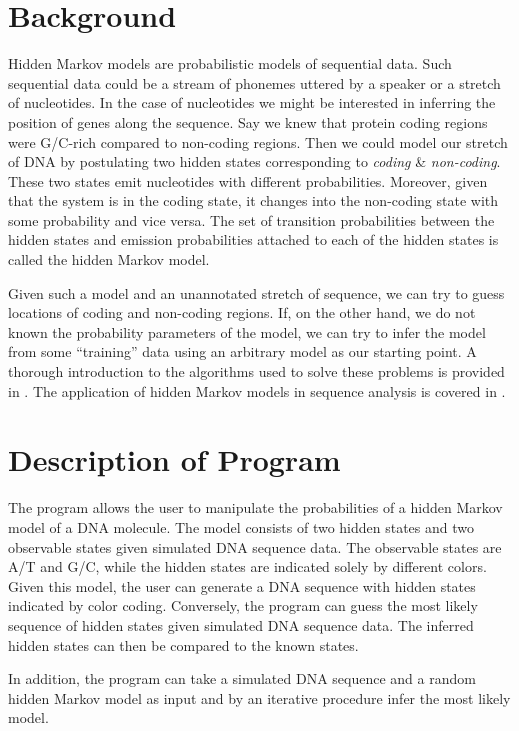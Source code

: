 \section{Background}
Hidden Markov models are probabilistic models of sequential data. Such
sequential data could be a stream of phonemes uttered by a speaker or
a stretch of nucleotides. In the case of nucleotides we might be
interested in inferring the position of genes along the sequence. Say we knew that
protein coding regions
were G/C-rich compared to non-coding regions. Then we could model our
stretch of DNA by postulating two hidden states corresponding to
\textit{coding} \& \textit{non-coding}. These two states emit nucleotides with
different probabilities. Moreover, given that the system is in the
coding state, it changes into the non-coding state with some
probability and vice versa. The set of transition probabilities between the
hidden states and emission probabilities attached to each of the hidden states is
called the hidden Markov model.

Given such a model and an unannotated stretch of sequence, we
can try to guess locations of coding and non-coding regions. If, on
the other hand, we do not known the probability parameters
of the model, we can try to infer the model from some ``training''
data using an arbitrary model as our starting point. A thorough
introduction to the algorithms used to solve these problems is
provided in \cite{rab89:mar}. The application of hidden Markov models
in sequence analysis is covered in \cite{dur98:bio}.

\section{Description of Program}
The program allows the user to manipulate the probabilities of a hidden Markov model of a DNA
molecule. The model consists of two hidden states and two observable
states given simulated DNA sequence data. The observable states are A/T and G/C, while the hidden states
are indicated solely by different colors. Given this model, the user can generate a DNA
sequence with hidden states indicated by color coding. Conversely, 
the program can guess the most likely sequence of hidden states given
simulated DNA sequence data. The
inferred hidden states can then be compared to the known states.

In addition, the program can take a simulated DNA sequence and a
random hidden Markov model as input and by an iterative procedure
infer the most likely model. 

